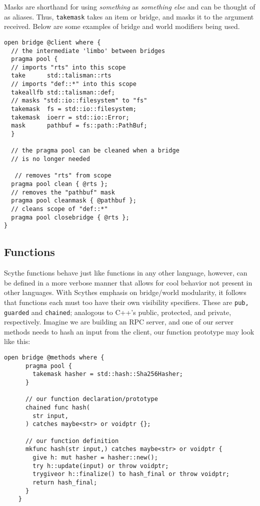 \documentclass{article}
\begin{document}
Masks are shorthand for using \emph{something} as \emph{something else} and can be thought of as aliases. Thus, \lstinline[style=scythe_style]{takemask} takes an item or bridge, and masks it to the argument received. Below are some examples of bridge and world modifiers being used.
\begin{lstlisting}[style=scythe_style]
open bridge @client where {
  // the intermediate 'limbo' between bridges
  pragma pool {
  // imports "rts" into this scope
  take      std::talisman::rts
  // imports "def::*" into this scope
  takeallfb std::talisman::def;
  // masks "std::io::filesystem" to "fs"
  takemask  fs = std::io::filesystem;
  takemask  ioerr = std::io::Error;
  mask      pathbuf = fs::path::PathBuf;
  }

  // the pragma pool can be cleaned when a bridge 
  // is no longer needed
  
   // removes "rts" from scope
  pragma pool clean { @rts };  
  // removes the "pathbuf" mask
  pragma pool cleanmask { @pathbuf };   
  // cleans scope of "def::*"
  pragma pool closebridge { @rts };     
}
\end{lstlisting}

\subsection{Functions}
Scythe functions behave just like functions in any other language, however, can be defined in a more verbose manner that allows for cool behavior not present in other languages. With Scythes emphasis on bridge/world modularity, it follows that functions each must too have their own visibility specifiers. These are \lstinline[style=scythe_style]{pub, guarded} and 
\lstinline[style=scythe_style]{chained}; analogous to C++'s public, protected, and private, respectively. Imagine we are building an RPC server, and one of our server methods needs to hash an input from the client, our function prototype may look like this:
\begin{lstlisting}[style=scythe_style]
    open bridge @methods where {
      pragma pool {
        takemask hasher = std::hash::Sha256Hasher;
      }
      
      // our function declaration/prototype
      chained func hash(
        str input,
      ) catches maybe<str> or voidptr {};

      // our function definition
      mkfunc hash(str input,) catches maybe<str> or voidptr {
        give h: mut hasher = hasher::new();
        try h::update(input) or throw voidptr;
        trygiveor h::finalize() to hash_final or throw voidptr;
        return hash_final;
      }
    }
\end{lstlisting}
\end{document}
